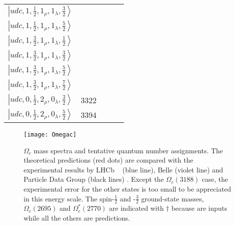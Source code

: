 \documentclass[twocolumn,superscriptaddress,preprintnumbers,nofootinbib]{revtex4}
\begin{document}
\begin{table*}[htbp]
\begin{tabular}{ccccc}
 $\left| udc,1, \frac{1}{2},1_{\rho},1_{\lambda}, \frac{3}{2} \right\rangle  $& & & &  \\
$\left| udc,1, \frac{1}{2},1_{\rho},1_{\lambda}, \frac{5}{2} \right\rangle  $& & & &  \\
 $\left| udc,1, \frac{3}{2},1_{\rho},1_{\lambda}, \frac{1}{2} \right\rangle  $& & & &  \\
 $\left| udc,1, \frac{3}{2},1_{\rho},1_{\lambda}, \frac{3}{2} \right\rangle  $& & & &  \\
 $\left| udc,1, \frac{3}{2},1_{\rho},1_{\lambda}, \frac{5}{2} \right\rangle  $& & & &  \\
$\left| udc,1, \frac{3}{2},1_{\rho},1_{\lambda}, \frac{7}{2} \right\rangle  $& & & &  \\
 $\left| udc,0, \frac{1}{2},2_{\rho},0_{\lambda}, \frac{3}{2} \right\rangle  $&3322 & & &  \\
$\left| udc,0, \frac{1}{2},2_{\rho},0_{\lambda}, \frac{5}{2} \right\rangle  $&3394 & & &  \\
\hline
\hline
\end{tabular}
\label{tab:widthsLambdac}
\end{table*}



\begin{figure}[htbp]
\caption{$\Omega_c$ mass spectra and tentative quantum number assignments. The theoretical predictions (red dots) are compared with the experimental results by LHCb ~\cite{Aaij:2017nav} (blue line), Belle \cite{Yelton:2017qxg} (violet line) and Particle Data Group (black lines) \cite{Tanabashi:2018oca}. Except the $\Omega_c(3188)$ case, the experimental error for the other states is too small to be appreciated in this energy scale. The spin-$\frac{1}{2}$ and -$\frac{3}{2}$ ground-state masses, $\Omega_c(2695)$
and $\Omega_c^{*}(2770)$ are indicated with $\dagger$  because are inputs while all the others are predictions.}
\begin{center}
\texttt{[image: Omegac]}
\label{spectrum1}
\end{center}
\end{figure}  
\end{document}
